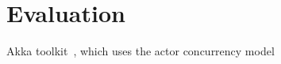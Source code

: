 \section{Evaluation}

Akka toolkit~\cite{Akka}, which uses the actor concurrency model~\cite{butcher2014seven}
